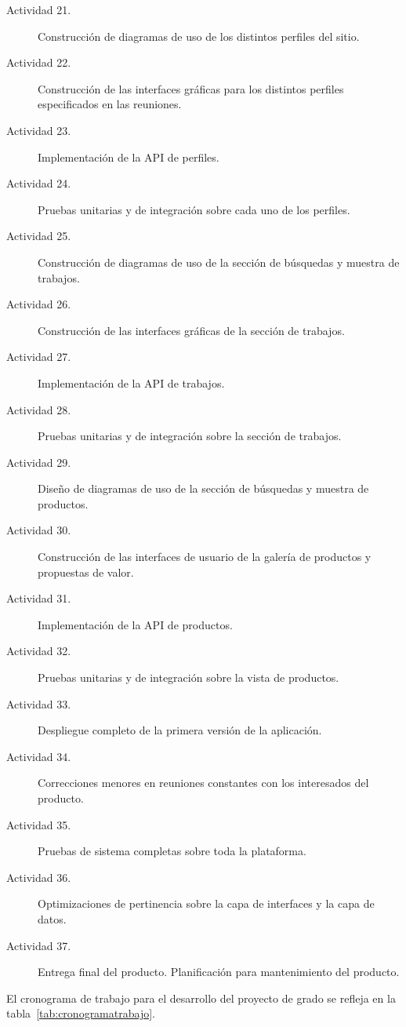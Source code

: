 \begin{description}
    \item[Actividad 21.] Construcción de diagramas de uso de los distintos perfiles del sitio.
    \item[Actividad 22.] Construcción de las interfaces gráficas para los distintos perfiles especificados en las reuniones.
    \item[Actividad 23.] Implementación de la API de perfiles.
    \item[Actividad 24.] Pruebas unitarias y de integración sobre cada uno de los perfiles.
    \item[Actividad 25.] Construcción de diagramas de uso de la sección de búsquedas y muestra de trabajos.
    \item[Actividad 26.] Construcción de las interfaces gráficas de la sección de trabajos.
    \item[Actividad 27.] Implementación de la API de trabajos.
    \item[Actividad 28.] Pruebas unitarias y de integración sobre la sección de trabajos.
    \item[Actividad 29.] Diseño de diagramas de uso de la sección de búsquedas y muestra de productos.
    \item[Actividad 30.] Construcción de las interfaces de usuario de la galería de productos y propuestas de valor.
    \item[Actividad 31.] Implementación de la API de productos.
    \item[Actividad 32.] Pruebas unitarias y de integración sobre la vista de productos.
    \item[Actividad 33.] Despliegue completo de la primera versión de la aplicación.
    \item[Actividad 34.] Correcciones menores en reuniones constantes con los interesados del producto.
    \item[Actividad 35.] Pruebas de sistema completas sobre toda la plataforma.
    \item[Actividad 36.] Optimizaciones de pertinencia sobre la capa de interfaces y la capa de datos.
    \item[Actividad 37.] Entrega final del producto.
    Planificación para mantenimiento del producto.
\end{description}

El cronograma de trabajo para el desarrollo del proyecto de grado se refleja en la tabla~\ref{tab:cronogramatrabajo}.

